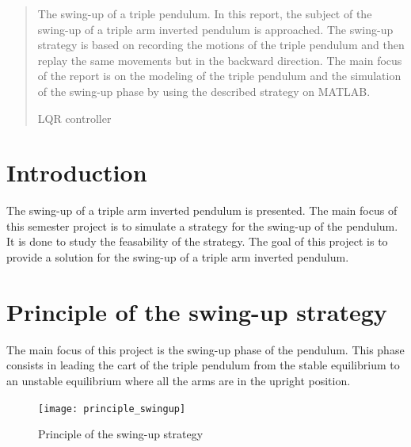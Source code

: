 \documentclass[a4paper,12pt,twoside]{article}
\begin{document}
\renewcommand{\headheight}{14.5pt}
\renewcommand{\tablename}{Table}
\renewcommand{\figurename}{Figure}

\hypersetup{pageanchor=false}

\hypersetup{pageanchor=true}

\newpage
\thispagestyle{empty}
\tableofcontents
\newpage


\begin{abstract}
The swing-up of a triple pendulum.
In this report, the subject of the swing-up of a triple arm inverted pendulum is approached. The swing-up strategy is based on recording the motions of the triple pendulum and then replay the same movements but in the backward direction. The main focus of the report is on the modeling of the triple pendulum and the simulation of the swing-up phase by using the described strategy on MATLAB.

LQR controller
\end{abstract}

\section{Introduction}\label{sec:intro} %
The swing-up of a triple arm inverted pendulum is presented. The main focus of this semester project is to simulate a strategy for the swing-up of the pendulum. It is done to study the feasability of the strategy.
The goal of this project is to provide a solution for the swing-up of a triple arm inverted pendulum.

\section{Principle of the swing-up strategy}
The main focus of this project is the swing-up phase of the pendulum. This phase consists in leading the cart of the triple pendulum from the stable equilibrium to an unstable equilibrium where all the arms are in the upright position.
\begin{figure}[ht]
	\centering
	\texttt{[image: principle\_swingup]}
	\caption{Principle of the swing-up strategy}
	\label{fig:swingup_strategy}
\end{figure}
\end{document}
